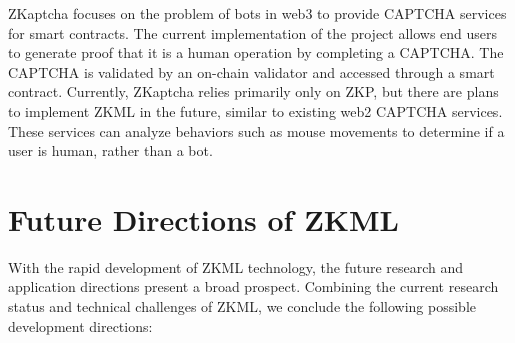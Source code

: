 \documentclass[journal]{IEEEtran}
\begin{document}
ZKaptcha \cite{zkaptcha} focuses on the problem of bots in web3 to provide CAPTCHA services for smart contracts. The current implementation of the project allows end users to generate proof that it is a human operation by completing a CAPTCHA. The CAPTCHA is validated by an on-chain validator and accessed through a smart contract. Currently, ZKaptcha relies primarily only on ZKP, but there are plans to implement ZKML in the future, similar to existing web2 CAPTCHA services. These services can analyze behaviors such as mouse movements to determine if a user is human, rather than a bot.

\section{Future Directions of ZKML}\label{s:5}

With the rapid development of ZKML technology, the future research and application directions present a broad prospect. Combining the current research status and technical challenges of ZKML, we conclude the following possible development directions:
\end{document}
